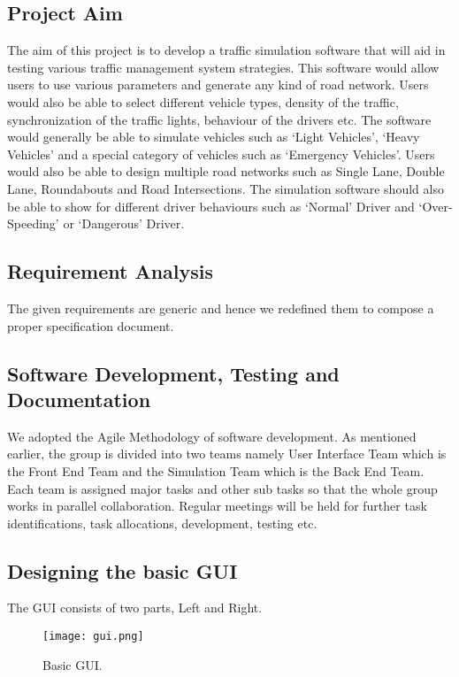 \documentclass[11pt]{article}
\begin{document}
\subsection{Project Aim}

The aim of this project is to develop a traffic simulation software that will aid in testing various traffic management system strategies. This software would allow users to use various parameters and generate any kind of road network. Users would also be able to select different vehicle types, density of the traffic, synchronization of the traffic lights, behaviour of the drivers etc. The software would generally be able to simulate vehicles such as ‘Light Vehicles’, ‘Heavy Vehicles’ and a special category of vehicles such as ‘Emergency Vehicles’. Users would also be able to design multiple road networks such as Single Lane, Double Lane, Roundabouts and Road Intersections. The simulation software should also be able to show for different driver behaviours such as ‘Normal’ Driver and ‘Over-Speeding’ or ‘Dangerous’ Driver. 

\subsection{Requirement Analysis}

The given requirements are generic and hence we redefined them to compose a proper specification document.

\subsection{Software Development, Testing and Documentation}

We adopted the Agile Methodology of software development. As mentioned earlier, the group is divided into two teams namely User Interface Team which is the Front End Team and the Simulation Team which is the Back End Team. Each team is assigned major tasks and other sub tasks so that the whole group works in parallel collaboration. Regular meetings will be held for further task identifications, task allocations, development, testing etc.

\subsection{Designing the basic GUI}

The GUI consists of two parts, Left and Right.

\begin{figure}[!ht]
\centering
\texttt{[image: gui.png]}
\caption{\label{fig:gui}Basic GUI.}
\end{figure}
\end{document}
